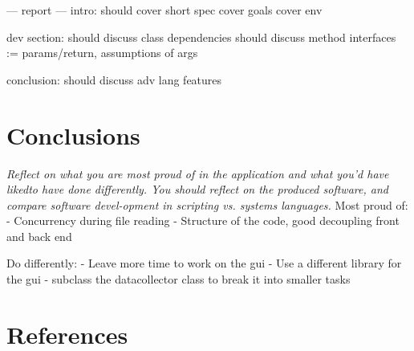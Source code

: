 \documentclass[11pt]{article}
\begin{document}
--- report ---
intro:
    should cover short spec
    cover goals
    cover env

dev section:
    should discuss class dependencies
    should discuss method interfaces := params/return, assumptions of args

conclusion:
    should discuss adv lang features




\section{Conclusions}
\emph{Reflect on what you are most proud of in the application and what you’d have likedto have done differently.  You should reflect on the produced software, and compare software devel-opment in scripting vs.  systems languages.}
Most proud of:
- Concurrency during file reading
- Structure of the code, good decoupling front and back end

Do differently:
- Leave more time to work on the gui
- Use a different library for the gui
- subclass the datacollector class to break it into smaller tasks


\pagebreak
\appendix
\section{References}
\printbibliography
\end{document}
